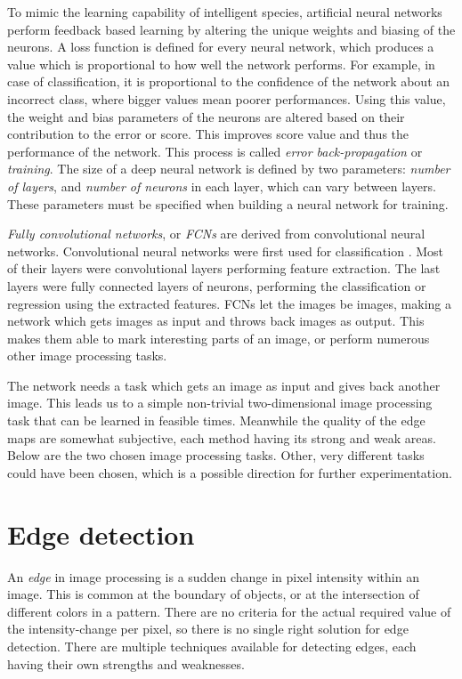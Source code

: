 \documentclass[12pt]{report}
\begin{document}
To mimic the learning capability of intelligent species, artificial neural networks perform feedback based learning by altering the unique weights and biasing of the neurons. A loss function is defined for every neural network, which produces a value which is proportional to how well the network performs. For example, in case of classification, it is proportional to the confidence of the network about an incorrect class, where bigger values mean poorer performances. Using this value, the weight and bias parameters of the neurons are altered based on their contribution to the error or score. This improves score value and thus the performance of the network. This process is called \textit{error back-propagation} or \textit{training}. The size of a deep neural network is defined by two parameters: \textit{number of layers}, and \textit{number of neurons} in each layer, which can vary between layers. These parameters must be specified when building a neural network for training.

\textit{Fully convolutional networks}, or \textit{FCNs} are derived from convolutional neural networks. Convolutional neural networks were first used for classification \cite{applications}. Most of their layers were convolutional layers performing feature extraction. The last layers were fully connected layers of neurons, performing the classification or regression using the extracted features. FCNs let the images be images, making a network which gets images as input and throws back images as output. This makes them able to mark interesting parts of an image, or perform numerous other image processing tasks.

The network needs a task which gets an image as input and gives back another image. This leads us to a simple non-trivial two-dimensional image processing task that can be learned in feasible times. Meanwhile the quality of the edge maps are somewhat subjective, each method having its strong and weak areas. Below are the two chosen image processing tasks. Other, very different tasks could have been chosen, which is a possible direction for further experimentation.
\section{Edge detection}
An \textit{edge} in image processing is a sudden change in pixel intensity within an image. This is common at the boundary of objects, or at the intersection of different colors in a pattern. There are no criteria for the actual required value of the intensity-change per pixel, so there is no single right solution for edge detection. There are multiple techniques available for detecting edges, each having their own strengths and weaknesses.
\end{document}
